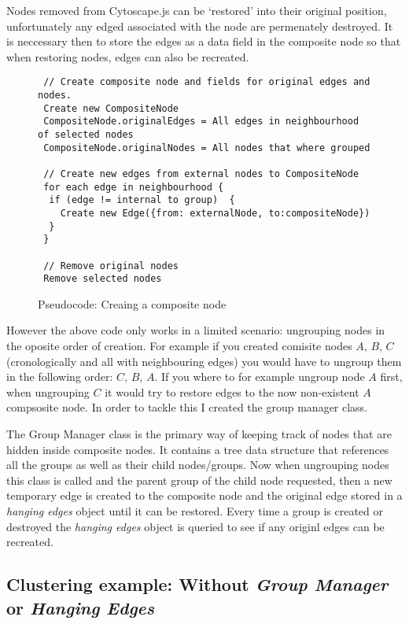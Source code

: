 Nodes removed from Cytoscape.js can be `restored' into their original position, unfortunately any edged associated with the node are permenately destroyed. It is neccessary then to store the edges as a data field in the composite node so that when restoring nodes, edges can also be recreated. 

\begin{figure}[h]
  \centering
  \begin{lstlisting}
 // Create composite node and fields for original edges and nodes.
 Create new CompositeNode 
 CompositeNode.originalEdges = All edges in neighbourhood of selected nodes
 CompositeNode.originalNodes = All nodes that where grouped

 // Create new edges from external nodes to CompositeNode
 for each edge in neighbourhood {
  if (edge != internal to group)  {
    Create new Edge({from: externalNode, to:compositeNode})
  }
 }

 // Remove original nodes
 Remove selected nodes
 \end{lstlisting}
 \caption{Pseudocode: Creaing a composite node}
\end{figure}

However the above code only works in a limited scenario: ungrouping nodes in the oposite order of creation. For example if you created comisite nodes $A$, $B$, $C$ (cronologically and all with neighbouring edges) you would have to ungroup them in the following order: $C$, $B$, $A$. If you where to for example ungroup node $A$ first, when ungrouping $C$ it would try to restore edges to the now non-existent $A$ compsosite node. In order to tackle this I created the group manager class.

The Group Manager class is the primary way of keeping track of nodes that are hidden inside composite nodes. It contains a tree data structure that references all the groups as well as their child nodes/groups. Now when ungrouping nodes this class is called and the parent group of the child node requested, then a new temporary edge is created to the composite node and the original edge stored in a \textit{hanging edges} object until it can be restored. Every time a group is created or destroyed the \textit{hanging edges} object is queried to see if any originl edges can be recreated.

\subsection{Clustering example: Without \textit{Group Manager} or \textit{Hanging Edges}}

